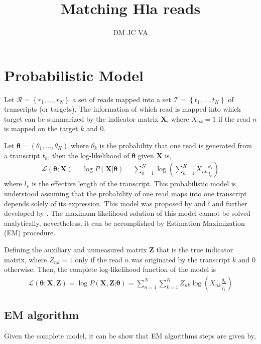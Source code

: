 \documentclass[12pt]{article}
\newcommand{\mc}{\mathcal}
\begin{document}
\title{Matching Hla reads}
\author{DM JC VA}
\maketitle 

\section{Probabilistic Model}

Let $\mc{R}= \left\{r_1,\ldots, r_N\right\}$ a set of reads mapped into a set
$\mc T = \left\{t_1,\ldots,t_K\right\}$ of transcripts (or targets).  The
information of which read is mapped into which target can be summarized by
the indicator matrix $\bm X$, where $X_{nk} = 1$ if the read $n$ is mapped on
the target $k$ and $0$.

Let $\bm \theta =(\theta_1, \ldots, \theta_K)$ where $\theta_k$ is 
the probability that one read is generated from a transcript $t_k$, then the
log-likelihood of $\bm \theta$ given $\bm X$ is, 
\begin{align}
    \label{eq:}
    \mc L (\bm \theta; \bm X) = \log P(\bm X| \bm \theta) = \sum_{n=1}^N 
    \log\left(\sum_{k=1}^K X_{nk}\frac{\theta_k}{\tilde l_k}\right)
\end{align}
where $\tilde l_k$ is the effective length of the transcript. This
probabilistic model is understood assuming that the probability of one read 
maps into one transcript depends solely of its expression. This model was 
proposed by \cite{} and \cite{}î and further developed by \cite{}.
The maximum likelihood solution of this model cannot be solved
analytically, nevertheless, it can be accomplished by Estimation Maximization
(EM) procedure. 

Defining the auxiliary and unmeasured matrix $\bm Z$ that is the true indicator
matrix, where $Z_{nk}=1$ only if the read $n$ was originated by the transcript
$k$ and $0$ otherwise. Then, the complete log-likelihood function of the model
is 
\begin{align}
    \label{eq:}
    \mc L (\bm \theta; \bm X, \bm Z) = \log P(\bm X, \bm Z| \bm \theta) = \sum_{n=1}^N 
    \sum_{k=1}^K Z_{nk}\log\left( X_{nk}\frac{\theta_k}{\tilde l_k}\right)
\end{align}

\subsection{EM algorithm}

Given the complete model, it can be show that EM algorithms steps are given by,
\end{document}

